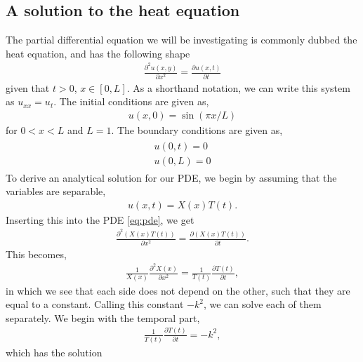 
\subsection{A solution to the heat equation}
The partial differential equation we will be investigating is commonly dubbed the heat equation, and has the following shape
\begin{align}
    \frac{\partial^2 u(x,y)}{\partial x^2} = \frac{\partial u(x,t)}{\partial t}
    \label{eq:pde}
\end{align}
given that $t>0$, $x\in [0,L]$. As a shorthand notation, we can write this system as $u_{xx} = u_{t}$. The initial conditions are given as,
\begin{align}
    u(x,0) = \sin(\pi x / L)
    \label{eq:initial-conds}
\end{align}
for $0 < x < L$ and $L = 1$. The boundary conditions are given as,
\begin{align}
    \begin{split}
        u(0,t) = 0 \\
        u(0,L) = 0
    \end{split}
    \label{eq:boundary-conditions}
\end{align}
To derive an analytical solution for our PDE, we begin by assuming that the variables are separable,
\begin{align*}
    u(x,t) = X(x)T(t).
\end{align*}
Inserting this into the PDE \eqref{eq:pde}, we get
\begin{align*}
    \frac{\partial^2 \left(X(x)T(t)\right)}{\partial x^2} = \frac{\partial \left(X(x)T(t)\right)}{\partial t}.
\end{align*}
This becomes,
\begin{align*}
    \frac{1}{X(x)}\frac{\partial^2 X(x)}{\partial x^2} = \frac{1}{T(t)}\frac{\partial T(t)}{\partial t},
\end{align*}
in which we see that each side does not depend on the other, such that they are equal to a constant. Calling this constant $-k^2$, we can solve each of them separately. We begin with the temporal part,
\begin{align*}
    \frac{1}{T(t)}\frac{\partial T(t)}{\partial t} = -k^2,
\end{align*}
which has the solution
